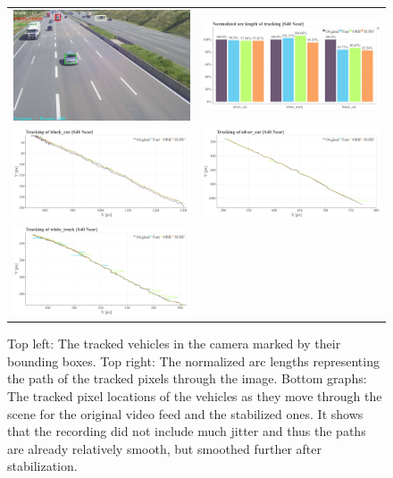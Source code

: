 \begin{figure}[!ht]
  \centering
  \begin{tabular}{cc}
    \includegraphics[width=0.45\linewidth]{diagrams/object_tracking/s40_n_near/frame.png}    &  
    \includegraphics[width=0.475\linewidth]{diagrams/object_tracking/s40_n_near/normalized_arc_lengths.html.png}    \\

    \includegraphics[width=0.475\linewidth]{diagrams/object_tracking/s40_n_near/black_car.png}    &  
    \includegraphics[width=0.475\linewidth]{diagrams/object_tracking/s40_n_near/silver_car.png}    \\  
    \includegraphics[width=0.475\linewidth]{diagrams/object_tracking/s40_n_near/white_truck.png}   
  \end{tabular}
  \caption{Top left:
  The tracked vehicles in the camera  marked by their bounding boxes. 
  Top right: 
  The normalized arc lengths representing the path of the tracked pixels through the image.
  Bottom graphs:
  The tracked pixel locations of the vehicles as they move through the scene for the original video feed and the stabilized ones.
  It shows that the recording did not include much jitter and thus the paths are already relatively smooth, but smoothed further after stabilization.
   }
  \label{fig:object_tracking_appendix_s40_n_near}
\end{figure}



